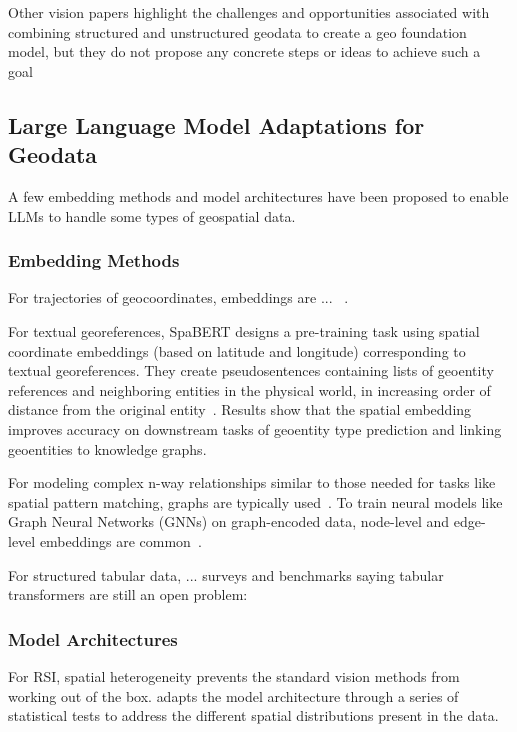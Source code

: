 Other vision papers highlight the challenges and opportunities associated with combining structured and unstructured geodata to create a geo foundation model, but they do not propose any concrete steps or ideas to achieve such a goal~\cite{Xie2023, Tan2023}



\subsection{Large Language Model Adaptations for Geodata}
A few embedding methods and model architectures have been proposed to enable LLMs to handle some types of geospatial data.

\subsubsection{Embedding Methods}
For trajectories of geocoordinates, embeddings are ... ~\cite{Hu2023}.

For textual georeferences, SpaBERT designs a pre-training task using spatial coordinate embeddings (based on latitude and longitude) corresponding to textual georeferences.
They create pseudosentences containing lists of geoentity references and neighboring entities in the physical world, in increasing order of distance from the original entity~\cite{Li2021}.
Results show that the spatial embedding improves accuracy on downstream tasks of geoentity type prediction and linking geoentities to knowledge graphs.

For modeling complex n-way relationships similar to those needed for tasks like spatial pattern matching, graphs are typically used~\cite{Folkers2000, Chen2019, Fang2019, Osul2023b}.
To train neural models like Graph Neural Networks (GNNs) on graph-encoded data, node-level and edge-level embeddings are common~\cite{Bai2019,Krlevza2016,Liu2020Neural}. 
%

For structured tabular data, ... surveys and benchmarks saying tabular transformers are still an open problem:\cite{Cong2023, Badaro2023}
\cite{Iida2021, Somepalli2022, Seng2022, Yin2020, Herzig2020}

\subsubsection{Model Architectures}
For RSI, spatial heterogeneity prevents the standard vision methods from working out of the box. 
\cite{Xie2021} adapts the model architecture through a series of statistical tests to address the different spatial distributions present in the data.

